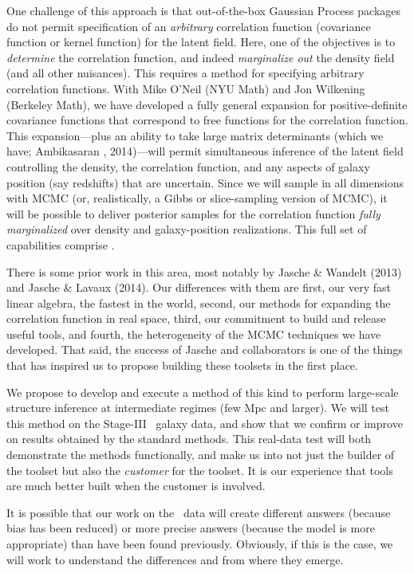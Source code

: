 \documentclass[12pt]{article}
\begin{document}
One challenge of this approach is that out-of-the-box Gaussian Process
packages do not permit specification of an \emph{arbitrary}
correlation function (covariance function or kernel function) for the
latent field.
Here, one of the objectives is to \emph{determine} the correlation
function, and indeed \emph{marginalize out} the density field (and all
other nuisances).
This requires a method for specifying arbitrary correlation functions.
With Mike O'Neil (NYU Math) and Jon Wilkening (Berkeley Math), we have
developed a fully general expansion for positive-definite covariance
functions that correspond to free functions for the correlation
function.
This expansion---plus an ability to take large matrix determinants
(which we have; Ambikasaran \etal, 2014)---will permit simultaneous inference of the
latent field controlling the density, the correlation function, and
any aspects of galaxy position (say redshifts) that are uncertain.
Since we will sample in all dimensions with MCMC (or, realistically, a
Gibbs or slice-sampling version of MCMC), it will be possible to
deliver posterior samples for the correlation function \emph{fully
  marginalized} over density and galaxy-position realizations.
This full set of capabilities comprise .

There is some prior work in this area, most notably by Jasche \&
Wandelt (2013) and Jasche \& Lavaux (2014).
Our differences with them are first, our very fast linear algebra, the
fastest in the world, second, our methods for expanding the
correlation function in real space, third, our commitment to build
and release useful tools, and fourth, the heterogeneity of the MCMC
techniques we have developed.
That said, the success of Jasche and collaborators is one of the
things that has inspired us to propose building these toolsets in the first place.

We propose to develop and execute a method of this kind to perform
large-scale structure inference at intermediate regimes (few Mpc and
larger).
We will test this method on the Stage-III \boss\ galaxy data, and show
that we confirm or improve on results obtained by the standard
methods.
This real-data test will both demonstrate the methods functionally,
and make us into not just the builder of the toolset but also the
\emph{customer} for the toolset.
It is our experience that tools are much better built when the
customer is involved.

It is possible that our work on the \boss\ data will create
different answers (because bias has been reduced) or more precise
answers (because the model is more appropriate) than have been found
previously.
Obviously, if this is the case, we will work to understand the
differences and from where they emerge.
\end{document}
